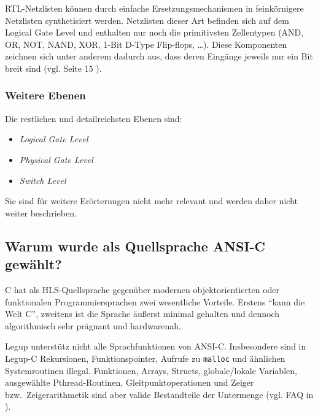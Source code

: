 \documentclass[oneside,a4paper]{article}
\def\C#1{\lstinline[style=c]{#1}}
\begin{document}
RTL-Netzlisten können durch einfache Ersetzungsmechanismen in feinkörnigere
Netzlisten synthetisiert werden. Netzlisten dieser Art befinden sich auf
dem Logical Gate Level und enthalten nur noch die primitivsten Zellentypen
(AND, OR, NOT, NAND, XOR, 1-Bit D-Type Flip-flops, \ldots{}). Diese Komponenten
zeichnen sich unter anderem dadurch aus, dass deren Eingänge
jeweils nur ein Bit breit sind (vgl. Seite 15 \cite{WOLF2015}).

\subsubsection{Weitere Ebenen}
Die restlichen und detailreichsten Ebenen sind:

\begin{itemize}
  \item \emph{Logical Gate Level}
  \item \emph{Physical Gate Level}
  \item \emph{Switch Level}
\end{itemize}

Sie sind für weitere Erörterungen nicht mehr relevant und
werden daher nicht weiter beschrieben.

\subsection{Warum wurde als Quellsprache ANSI-C gewählt?}

C hat als HLS-Quellsprache gegenüber modernen
objektorientierten oder funktionalen Programmiersprachen
zwei wesentliche Vorteile. Erstens ``kann die Welt C'', zweitens ist die Sprache
äußerst minimal gehalten und dennoch algorithmisch sehr prägnant und hardwarenah.

Legup unterstütz nicht alle Sprachfunktionen von ANSI-C. Insbesondere sind
in Legup-C Rekursionen, Funktionspointer,
Aufrufe zu \C{malloc} und ähnlichen Systemroutinen illegal.
Funktionen, Arrays, Structs, globale/lokale Variablen,
ausgewählte Pthread-Routinen, Gleitpunktoperationen und
Zeiger bzw.\ Zeigerarithmetik sind aber valide Bestandteile der
Untermenge (vgl. FAQ in \cite{LEGUP}).
\end{document}
